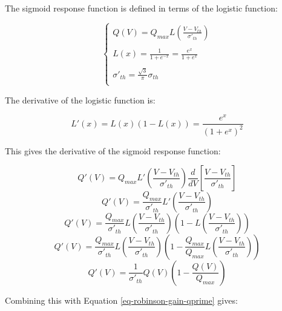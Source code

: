 The sigmoid response function is defined in terms of the logistic function:

\begin{equation}
\left \{
\begin{array}{l}
Q(V) = Q_{max} L \left (\frac{V - V_{th}}{\sigma'_{th}} \right ) \\
\\
L(x) = \frac{1}{1 + e^{-x}} = \frac{e^x}{1 + e^x} \\
\\
\sigma'_{th} = \frac{\sqrt{3}}{\pi}\sigma_{th} \\
\end{array}
\right .
\label{eq-robinson-sigmoid-logistic}
\end{equation}

The derivative of the logistic function is:

\begin{equation}
L'(x) = L(x) \left ( 1 - L(x) \right ) = \frac{e^x}{(1 + e^x)^2}
\label{eq-robinson-logistic-derivative}
\end{equation}

This gives the derivative of the sigmoid response function:

\begin{equation}
Q'(V) = Q_{max} L' \left ( \frac{V - V_{th}}{\sigma'_{th}} \right )
\frac{d}{dV} \left [ \frac{V - V_{th}}{\sigma'_{th}} \right ]
\end{equation}
%
\begin{equation}
Q'(V) = \frac{Q_{max}}{\sigma'_{th}}
L' \left ( \frac{V - V_{th}}{\sigma'_{th}} \right )
\end{equation}
%
\begin{equation}
Q'(V) = \frac{Q_{max}}{\sigma'_{th}}
L \left ( \frac{V - V_{th}}{\sigma'_{th}} \right )
\left ( 1 - L \left ( \frac{V - V_{th}}{\sigma'_{th}} \right ) \right )
\end{equation}
%
\begin{equation}
Q'(V) = \frac{Q_{max}}{\sigma'_{th}}
L \left ( \frac{V - V_{th}}{\sigma'_{th}} \right )
\left ( 1 - \frac{Q_{max}}{Q_{max}}
L \left ( \frac{V - V_{th}}{\sigma'_{th}} \right ) \right )
\end{equation}
%
\begin{equation}
Q'(V) = \frac{1}{\sigma'_{th}} Q(V) \left ( 1 - \frac{Q(V)}{Q_{max}} \right )
\label{eq-robinson-sigmoid-derivative}
\end{equation}

Combining this with Equation \ref{eq-robinson-gain-qprime} gives:

